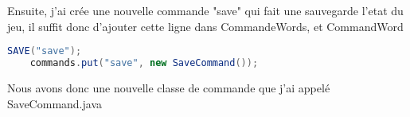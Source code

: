 \documentclass[a4paper , 10pt]{article}
\begin{document}
Ensuite, j'ai crée une nouvelle commande "save" qui fait une sauvegarde l'etat du jeu, il suffit donc d'ajouter cette ligne dans CommandeWords, et CommandWord
\begin{lstlisting}[language=Java, caption={CommandeWords Et CommandWord}]
    SAVE("save");
    commands.put("save", new SaveCommand());
\end{lstlisting}

Nous avons donc une nouvelle classe de commande que j'ai appelé SaveCommand.java
\begin{lstlisting}[language=Java, caption={SaveCommand}]

\end{lstlisting}
\end{document}
